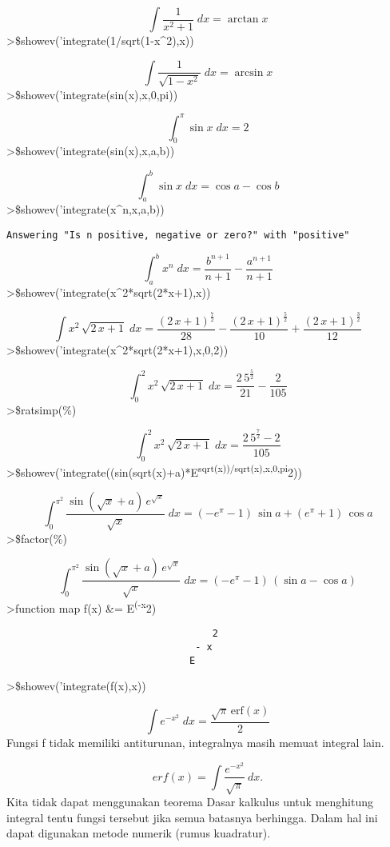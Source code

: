 \documentclass[
]{book}
\begin{document}
\[\int {\frac{1}{x^2+1}}{\;dx}=\arctan x\]\textgreater\$showev('integrate(1/sqrt(1-x\^{}2),x))

\[\int {\frac{1}{\sqrt{1-x^2}}}{\;dx}=\arcsin x\]\textgreater\$showev('integrate(sin(x),x,0,pi))

\[\int_{0}^{\pi}{\sin x\;dx}=2\]\textgreater\$showev('integrate(sin(x),x,a,b))

\[\int_{a}^{b}{\sin x\;dx}=\cos a-\cos b\]\textgreater\$showev('integrate(x\^{}n,x,a,b))

\begin{verbatim}
Answering "Is n positive, negative or zero?" with "positive"
\end{verbatim}

\[\int_{a}^{b}{x^{n}\;dx}=\frac{b^{n+1}}{n+1}-\frac{a^{n+1}}{n+1}\]\textgreater\$showev('integrate(x\^{}2*sqrt(2*x+1),x))

\[\int {x^2\,\sqrt{2\,x+1}}{\;dx}=\frac{\left(2\,x+1\right)^{\frac{7
 }{2}}}{28}-\frac{\left(2\,x+1\right)^{\frac{5}{2}}}{10}+\frac{\left(
 2\,x+1\right)^{\frac{3}{2}}}{12}\]\textgreater\$showev('integrate(x\^{}2*sqrt(2*x+1),x,0,2))

\[\int_{0}^{2}{x^2\,\sqrt{2\,x+1}\;dx}=\frac{2\,5^{\frac{5}{2}}}{21}-
 \frac{2}{105}\]\textgreater\$ratsimp(\%)

\[\int_{0}^{2}{x^2\,\sqrt{2\,x+1}\;dx}=\frac{2\,5^{\frac{7}{2}}-2}{
 105}\]\textgreater\$showev('integrate((sin(sqrt(x)+a)*E\textsuperscript{sqrt(x))/sqrt(x),x,0,pi}2))

\[\int_{0}^{\pi^2}{\frac{\sin \left(\sqrt{x}+a\right)\,e^{\sqrt{x}}}{
 \sqrt{x}}\;dx}=\left(-e^{\pi}-1\right)\,\sin a+\left(e^{\pi}+1
 \right)\,\cos a\]\textgreater\$factor(\%)

\[\int_{0}^{\pi^2}{\frac{\sin \left(\sqrt{x}+a\right)\,e^{\sqrt{x}}}{
 \sqrt{x}}\;dx}=\left(-e^{\pi}-1\right)\,\left(\sin a-\cos a\right)\]\textgreater function map f(x) \&= E\textsuperscript{(-x}2)

\begin{verbatim}
                                    2
                                 - x
                                E
\end{verbatim}

\textgreater\$showev('integrate(f(x),x))

\[\int {e^ {- x^2 }}{\;dx}=\frac{\sqrt{\pi}\,\mathrm{erf}\left(x
 \right)}{2}\]Fungsi f tidak memiliki antiturunan, integralnya masih memuat integral lain.

\[erf(x) = \int \frac{e^{-x^2}}{\sqrt{\pi}} \ dx.\]Kita tidak dapat menggunakan teorema Dasar kalkulus untuk menghitung integral tentu fungsi tersebut jika semua batasnya berhingga. Dalam hal ini dapat digunakan metode numerik (rumus kuadratur).
\end{document}
